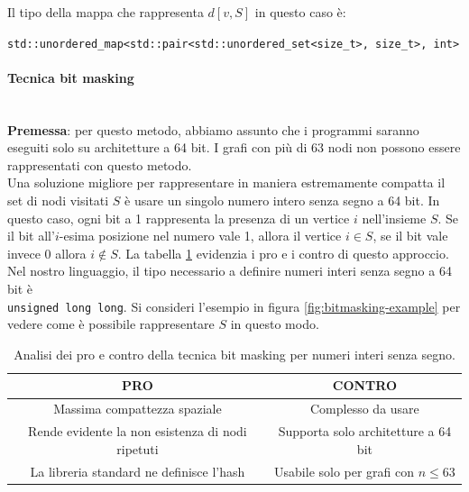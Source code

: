 \noindent Il tipo della mappa che rappresenta $d[v,S]$ in questo caso è:

\begin{center}
    \texttt{std::unordered_map<std::pair<std::unordered_set<size_t>, size_t>, int>}
\end{center}

\paragraph{Tecnica bit masking}\mbox{}\\

\noindent \textbf{Premessa}: per questo metodo, abbiamo assunto che i programmi saranno eseguiti solo su architetture a 64 bit. I grafi con più di 63 nodi non possono essere rappresentati con questo metodo. \\

\noindent Una soluzione migliore per rappresentare in maniera estremamente compatta il set di nodi visitati $S$ è usare un singolo numero intero senza segno a 64 bit. In questo caso, ogni bit a 1 rappresenta la presenza di un vertice $i$ nell'insieme $S$.
Se il bit all'$i$-esima posizione nel numero vale 1, allora il vertice $i \in S$, se il bit vale invece 0 allora $i \notin S$. La tabella \ref{tab:pro-cons-bit-masking} evidenzia i pro e i contro di questo approccio. \\

\noindent Nel nostro linguaggio, il tipo necessario a definire numeri interi senza segno a 64 bit è \\
\texttt{unsigned long long}. Si consideri l'esempio in figura \ref{fig:bitmasking-example} per vedere come è possibile rappresentare $S$ in questo modo.

\begin{table}[h]
  \centering
    \begin{tabular}{|c | c|}
    \hline
    \textbf{PRO} & \textbf{CONTRO} \\ [0.5ex]
    \hline\hline
    Massima compattezza spaziale & Complesso da usare \\
    \hline
    Rende evidente la non esistenza di nodi ripetuti & Supporta solo architetture a 64 bit \\
    \hline
    La libreria standard ne definisce l'hash & Usabile solo per grafi con $n \leq 63$ \\
    \hline
  \end{tabular}
    \caption{Analisi dei pro e contro della tecnica bit masking per numeri interi senza segno.}
    \label{tab:pro-cons-bit-masking}
\end{table}

